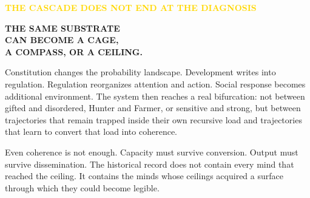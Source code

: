 \documentclass[10pt]{article}
\newcommand{\track}[1]{\addfontfeatures{LetterSpace=#1}}
\begin{document}
\clearpage

\color{Bone}
\thispagestyle{empty}

\vspace*{.74in}
{\sffamily\bfseries\fontsize{7.4}{9}\selectfont\track{190}\textcolor{Gold}{THE CASCADE DOES NOT END AT THE DIAGNOSIS}}\par
\vspace{.42in}
{\sffamily\bfseries\fontsize{24}{28}\selectfont THE SAME SUBSTRATE\\CAN BECOME A CAGE,\\A COMPASS, OR A CEILING.}\par
\vspace{.28in}{\color{Oxide}\rule{1.05in}{3pt}}\par

\vspace{.30in}
\begin{minipage}{.76\linewidth}
{\fontsize{11.6}{16.2}\selectfont
Constitution changes the probability landscape. Development writes into regulation. Regulation reorganizes attention and action. Social response becomes additional environment. The system then reaches a real bifurcation: not between gifted and disordered, Hunter and Farmer, or sensitive and strong, but between trajectories that remain trapped inside their own recursive load and trajectories that learn to convert that load into coherence.

Even coherence is not enough. Capacity must survive conversion. Output must survive dissemination. The historical record does not contain every mind that reached the ceiling. It contains the minds whose ceilings acquired a surface through which they could become legible.}
\end{minipage}
\end{document}

